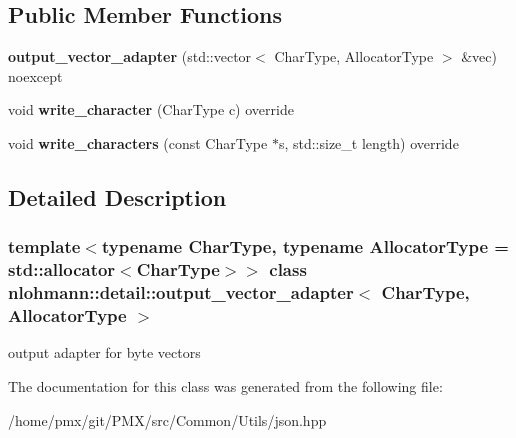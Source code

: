 \subsection*{Public Member Functions}
\begin{DoxyCompactItemize}
\item 
\mbox{\label{classnlohmann_1_1detail_1_1output__vector__adapter_a3fe56240156513c7d6c2db9063c9e0a3}} 
{\bfseries output\+\_\+vector\+\_\+adapter} (std\+::vector$<$ Char\+Type, Allocator\+Type $>$ \&vec) noexcept
\item 
\mbox{\label{classnlohmann_1_1detail_1_1output__vector__adapter_a75dd40842507f8604670ecfbf901ad0a}} 
void {\bfseries write\+\_\+character} (Char\+Type c) override
\item 
\mbox{\label{classnlohmann_1_1detail_1_1output__vector__adapter_a368ecbbeb00b34121ee951d86b77e276}} 
void {\bfseries write\+\_\+characters} (const Char\+Type $\ast$s, std\+::size\+\_\+t length) override
\end{DoxyCompactItemize}


\subsection{Detailed Description}
\subsubsection*{template$<$typename Char\+Type, typename Allocator\+Type = std\+::allocator$<$\+Char\+Type$>$$>$\newline
class nlohmann\+::detail\+::output\+\_\+vector\+\_\+adapter$<$ Char\+Type, Allocator\+Type $>$}

output adapter for byte vectors 

The documentation for this class was generated from the following file\+:\begin{DoxyCompactItemize}
\item 
/home/pmx/git/\+P\+M\+X/src/\+Common/\+Utils/json.\+hpp\end{DoxyCompactItemize}
